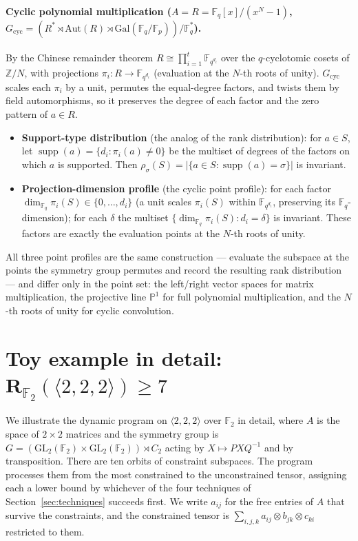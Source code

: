 \documentclass[11pt]{article}
\theoremstyle{definition}
\newcommand{\F}{\mathbb{F}}
\newcommand{\Rk}[2]{\mathbf{R}_{#1}(#2)}
\newcommand{\GL}{\mathrm{GL}}
\newcommand{\Gal}{\mathrm{Gal}}
\newcommand{\Aut}{\mathrm{Aut}}
\newcommand{\mmt}[3]{\langle #1,#2,#3\rangle}
\begin{document}
\paragraph{Cyclic polynomial multiplication ($A=R=\F_q[x]/(x^N-1)$, $G_{\mathrm{cyc}}=(R^*\rtimes\Aut(R)\rtimes\Gal(\F_q/\F_p))/\F_q^*$).}
By the Chinese remainder theorem $R\cong\prod_{i=1}^{t}\F_{q^{d_i}}$ over the
$q$-cyclotomic cosets of $\mathbb{Z}/N$, with projections
$\pi_i\colon R\to\F_{q^{d_i}}$ (evaluation at the $N$-th roots of unity).
$G_{\mathrm{cyc}}$ scales each $\pi_i$ by a unit, permutes the equal-degree
factors, and twists them by field automorphisms, so it preserves the degree of
each factor and the zero pattern of $a\in R$.
\begin{itemize}
  \item \textbf{Support-type distribution} (the analog of the rank
    distribution): for $a\in S$, let
    $\operatorname{supp}(a)=\{d_i:\pi_i(a)\ne0\}$ be the multiset of degrees of
    the factors on which $a$ is supported. Then
    $\rho_\sigma(S)=|\{a\in S:\operatorname{supp}(a)=\sigma\}|$ is invariant.
  \item \textbf{Projection-dimension profile} (the cyclic point profile): for
    each factor $\dim_{\F_q}\pi_i(S)\in\{0,\dots,d_i\}$ (a unit scales
    $\pi_i(S)$ within $\F_{q^{d_i}}$, preserving its $\F_q$-dimension); for each
    $\delta$ the multiset $\{\dim_{\F_q}\pi_i(S):d_i=\delta\}$ is invariant. These
    factors are exactly the evaluation points at the $N$-th roots of unity.
\end{itemize}

All three point profiles are the same construction --- evaluate the subspace at
the points the symmetry group permutes and record the resulting rank distribution
--- and differ only in the point set: the left/right vector spaces for matrix
multiplication, the projective line $\mathbb{P}^1$ for full polynomial
multiplication, and the $N$-th roots of unity for cyclic convolution.

\section{Toy example in detail: $\Rk{\F_2}{\mmt{2}{2}{2}}\ge 7$}\label{sec:toy-in-detail}

We illustrate the dynamic program on $\mmt{2}{2}{2}$ over $\F_2$ in detail, where $A$ is the
space of $2\times 2$ matrices and the symmetry group is
$G=(\GL_2(\F_2)\times\GL_2(\F_2))\rtimes C_2$ acting by $X\mapsto PXQ^{-1}$ and by
transposition. There are ten orbits of constraint subspaces. The program processes
them from the most constrained to the unconstrained tensor, assigning each a lower
bound by whichever of the four techniques of Section~\ref{sec:techniques} succeeds
first. We write $a_{ij}$ for the free entries of $A$ that survive the constraints,
and the constrained tensor is $\sum_{i,j,k} a_{ij}\otimes b_{jk}\otimes c_{ki}$
restricted to them.
\end{document}
